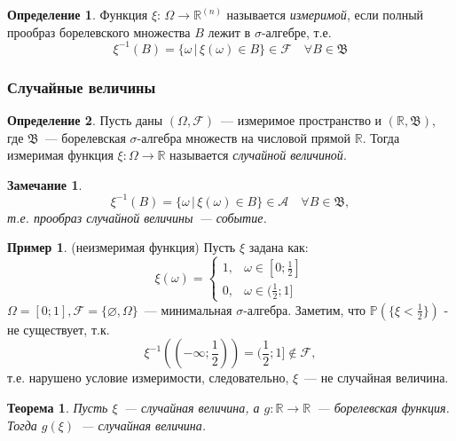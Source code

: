 \documentclass[oneside,final,14pt]{extreport}
\newcommand\myprob[1]{{\mathbb{P}(#1)}}
\newtheorem{thm}{Теорема}[section]
\newtheorem*{rmrk}{Замечание}
\theoremstyle{definition}
\newtheorem{defn}{Определение}[section]
\newtheorem*{exmp}{Пример}
\begin{document}
\begin{defn}
    Функция $\xi$: $\Omega \rightarrow \mathbb{R}^{(n)}$ называется {\it измеримой}, если полный прообраз борелевского множества $B$ лежит в $\sigma$-алгебре, т.е. 
    \begin{equation*}
        \xi^{-1}(B) = \{ \omega \,|\, \xi(\omega) \in B \} \in \mathcal{F} \quad \forall B \in \mathfrak{B}
    \end{equation*}
\end{defn}

\subsubsection{Случайные величины}
\begin{defn}
    Пусть даны $(\Omega, \mathcal{F})$~--- измеримое пространство и $(\mathbb{R}, \mathfrak{B})$, где $\mathfrak{B}$~--- борелевская $\sigma$-алгебра множеств на числовой прямой $\mathbb{R}$. Тогда измеримая функция $\xi: \Omega \to \mathbb{R}$ называется {\it случайной величиной}.
\end{defn}

\begin{rmrk}
\begin{equation*}
    \xi^{-1}(B) = \{\omega \,|\, \xi(\omega) \in B\} \in \mathcal{A} \quad \forall B \in \mathfrak{B},
\end{equation*}
    т.е. прообраз случайной величины~--- событие.
\end{rmrk}

\begin{exmp} (неизмеримая функция) Пусть $\xi$ задана как:
\begin{equation*}
    \xi(\omega)=\left\{\begin{array}{ll}
    1, & \omega \in [0; \frac{1}{2}] \\
    0, & \omega \in (\frac{1}{2}; 1]
\end{array}\right.
\end{equation*}
$\Omega = [0; 1], \mathcal{F} = \{\varnothing, \Omega\}$~--- минимальная $\sigma$-алгебра.  Заметим, что $\myprob{\{\xi < \frac{1}{2}\}}$ - не существует, т.к.
\begin{equation*}
    \xi^{-1}((-\infty;\frac{1}{2})) = (\frac{1}{2}; 1] \notin \mathcal{F},
\end{equation*}
т.е. нарушено условие измеримости, следовательно, $\xi$~--- не случайная величина.
\end{exmp} 

\begin{thm}
    Пусть $\xi$~--- случайная величина, а $g: \mathbb{R} \rightarrow \mathbb{R}$~--- борелевская функция. Тогда $g(\xi)$~--- случайная величина.
\end{thm}
\end{document}
